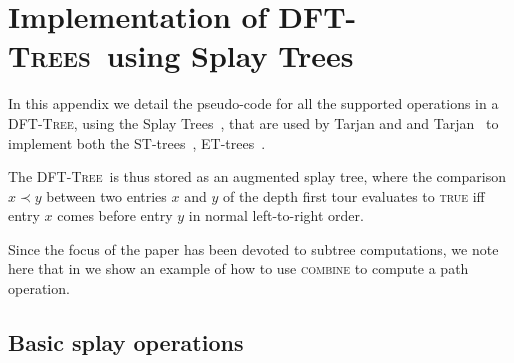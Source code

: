 \documentclass[a4paper,USenglish]{lipics}
\newcommand{\dft}{\textsc{DFT-Tree}}
\newcommand{\dfts}{\textsc{DFT-Trees}}
\begin{document}
		
\vfill 
\pagebreak












\vfill 
\pagebreak
\appendix









\section{Implementation of \dfts\ using Splay Trees}
\label{app:implementation}

In this appendix we detail the pseudo-code for all the supported operations in a \dft, using the Splay Trees~\cite{ST85}, that are used by Tarjan and  and Tarjan~\cite{TW09} to implement both the ST-trees~\cite{ST83,ST85}, ET-trees~\cite{HK99,Tar97}.

The \dft\ is thus stored as an augmented splay tree, where the comparison $x \prec y$ between two entries $x$ and $y$ of the depth first tour evaluates to \textsc{true} iff entry $x$ comes before entry $y$ in normal left-to-right order.

Since the focus of the paper has been devoted to subtree computations, we note here that in  we show an example of how to use \textsc{combine} to compute a path operation.


\subsection{Basic splay operations}
\end{document}
